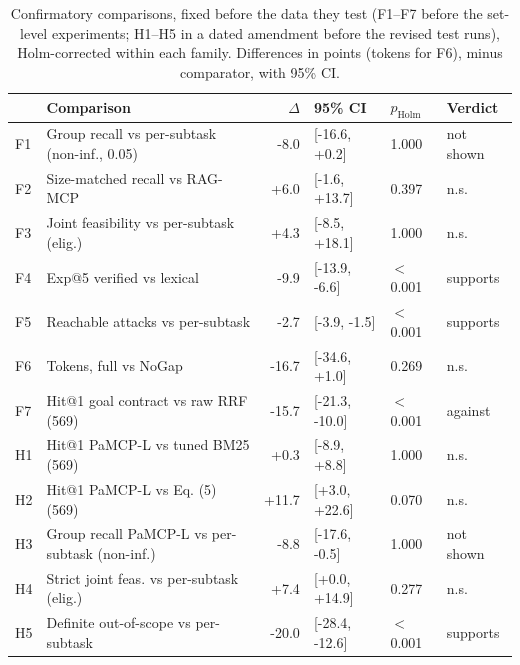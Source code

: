 \begin{table}[t]
\centering
\caption{Confirmatory comparisons, fixed before the data they test (F1--F7 before the set-level experiments; H1--H5
in a dated amendment before the revised test runs), Holm-corrected within each family. Differences in points
(tokens for F6), \pamcp{} minus comparator, with 95\% CI.}
\label{tab:ev-family}
\scriptsize
\setlength{\tabcolsep}{2.2pt}
\begin{tabular}{@{}llrlll@{}}
\toprule
 & Comparison & $\Delta$ & 95\% CI & $p_{\mathrm{Holm}}$ & Verdict \\
\midrule
F1 & Group recall vs per-subtask (non-inf., 0.05) & -8.0 & [-16.6, +0.2] & 1.000 & not shown \\
F2 & Size-matched recall vs RAG-MCP & +6.0 & [-1.6, +13.7] & 0.397 & n.s. \\
F3 & Joint feasibility vs per-subtask (elig.) & +4.3 & [-8.5, +18.1] & 1.000 & n.s. \\
F4 & Exp@5 verified vs lexical & -9.9 & [-13.9, -6.6] & $<$0.001 & supports \\
F5 & Reachable attacks vs per-subtask & -2.7 & [-3.9, -1.5] & $<$0.001 & supports \\
F6 & Tokens, full vs NoGap & -16.7 & [-34.6, +1.0] & 0.269 & n.s. \\
F7 & Hit@1 goal contract vs raw RRF (569) & -15.7 & [-21.3, -10.0] & $<$0.001 & against \\
\midrule
H1 & Hit@1 PaMCP-L vs tuned BM25 (569) & +0.3 & [-8.9, +8.8] & 1.000 & n.s. \\
H2 & Hit@1 PaMCP-L vs Eq. (5) (569) & +11.7 & [+3.0, +22.6] & 0.070 & n.s. \\
H3 & Group recall PaMCP-L vs per-subtask (non-inf.) & -8.8 & [-17.6, -0.5] & 1.000 & not shown \\
H4 & Strict joint feas. vs per-subtask (elig.) & +7.4 & [+0.0, +14.9] & 0.277 & n.s. \\
H5 & Definite out-of-scope vs per-subtask & -20.0 & [-28.4, -12.6] & $<$0.001 & supports \\
\bottomrule
\end{tabular}
\end{table}
